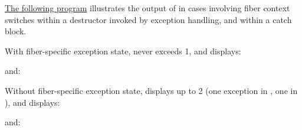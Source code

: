\newpage
{}\label{exfns}

\href{https://github.com/secondlife/3p-boost/blob/nat/exstate/tests/fccurrexc.cpp}{The following program}
illustrates the output of \exfns in cases involving fiber context
switches within a destructor invoked by exception handling, and within a catch
block.


With fiber-specific exception state, \uncexs never exceeds 1, and \curex
displays:


and:


Without fiber-specific exception state, \uncexs displays up to 2 (one
exception in \main, one in ), and \curex displays:


and:


